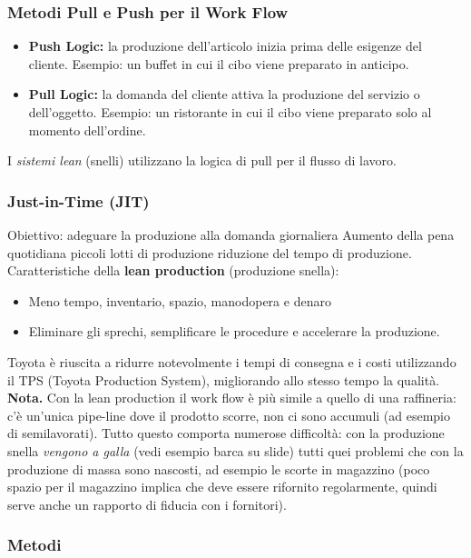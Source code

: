 \documentclass[a4paper,portrait,12pt]{article}
\theoremstyle{definition}
\begin{document}
\subsubsection{Metodi Pull e Push per il Work Flow}
\begin{itemize}
\item \textbf{Push Logic:} la produzione dell'articolo inizia prima delle esigenze del cliente.
Esempio: un buffet in cui il cibo viene preparato in anticipo.
\item \textbf{Pull Logic:} la domanda del cliente attiva la produzione del servizio o dell'oggetto.
Esempio: un ristorante in cui il cibo viene preparato solo al momento dell'ordine.
\end{itemize}
I \emph{sistemi lean} (snelli) utilizzano la logica di pull per il flusso di lavoro.

\subsubsection{Just-in-Time (JIT)}
Obiettivo: adeguare la produzione alla domanda giornaliera
Aumento della pena quotidiana piccoli lotti di produzione riduzione del tempo di produzione.\\

Caratteristiche della \textbf{lean production} (produzione snella):
\begin{itemize}
\item Meno tempo, inventario, spazio, manodopera e denaro
\item Eliminare gli sprechi, semplificare le procedure e accelerare la produzione.
\end{itemize}
Toyota è riuscita a ridurre notevolmente i tempi di consegna e i costi utilizzando il TPS (Toyota Production System), migliorando allo stesso tempo la qualità.\\

\textbf{Nota.} Con la lean production il work flow è più simile a quello di una raffineria: c'è un'unica pipe-line dove il prodotto scorre, non ci sono accumuli (ad esempio di semilavorati).
Tutto questo comporta numerose difficoltà: con la produzione snella \emph{vengono a galla} (vedi esempio barca su slide) tutti quei problemi che con la produzione di massa sono nascosti, ad esempio le scorte in magazzino (poco spazio per il magazzino implica che deve essere rifornito regolarmente, quindi serve anche un rapporto di fiducia con i fornitori).

\subsubsection{Metodi}
\end{document}
